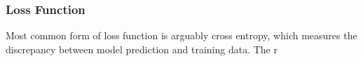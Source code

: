 \subsubsection{Loss Function}

Most common form of loss function is arguably cross entropy, which measures the discrepancy between model prediction and training data. The r